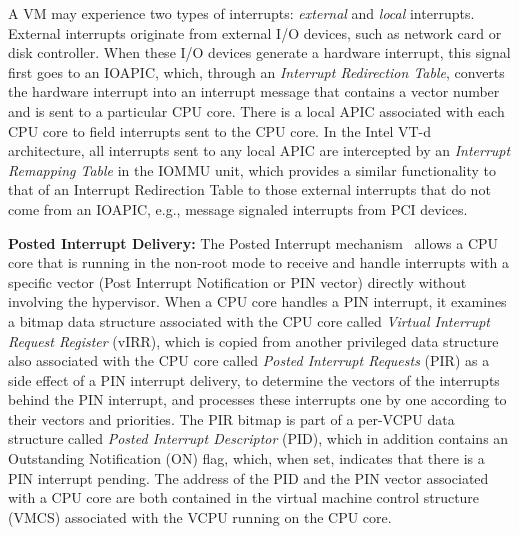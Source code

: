 A VM may experience two types of interrupts: {\em external} and {\em local} interrupts.
External interrupts originate from external I/O devices, such as network card or disk controller.
When these I/O devices generate a hardware interrupt, this signal first goes to an IOAPIC, which, through an {\em Interrupt Redirection Table}, 
converts the hardware interrupt into an interrupt message that contains a vector number and is sent to a particular CPU core.
There is a local APIC associated with each CPU core to field interrupts sent to the CPU core.
In the Intel VT-d architecture, all interrupts sent to any local APIC are intercepted by  an {\em Interrupt Remapping Table} in the IOMMU unit, 
which provides a similar functionality to that of an Interrupt Redirection Table
to those external interrupts that do not come from an IOAPIC, e.g., message signaled interrupts from PCI devices.

{\bf Posted Interrupt Delivery:}
The Posted Interrupt mechanism~\cite{intelvtd-paper,intelvtd-manual} allows a CPU core that is running in the non-root mode to receive and handle interrupts with a specific vector
(Post Interrupt Notification or PIN vector) directly without involving the hypervisor.
When a CPU core handles a PIN interrupt, it examines a bitmap data structure associated with the CPU core called {\em Virtual Interrupt Request Register} (vIRR),
which is copied from another privileged data structure also associated with the CPU core called {\em Posted Interrupt Requests} (PIR) as a side effect of a PIN interrupt delivery,  
to determine the vectors of the interrupts behind the PIN interrupt, and processes these interrupts one by one according to their vectors and priorities.
The PIR bitmap is part of a per-VCPU data structure called {\em Posted Interrupt Descriptor} (PID), which in addition contains an Outstanding Notification (ON) flag, which, when set, indicates that there is a PIN interrupt pending.  
The address of the PID and the PIN vector associated with a CPU core are both contained in the virtual machine control structure (VMCS) associated with the VCPU running on the CPU core.

